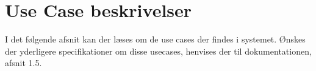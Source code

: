 \section{Use Case beskrivelser}
I det følgende afsnit kan der læses om de use cases der findes i systemet. Ønskes der yderligere specifikationer om disse usecases, henvises der til dokumentationen, afsnit 1.5. 

